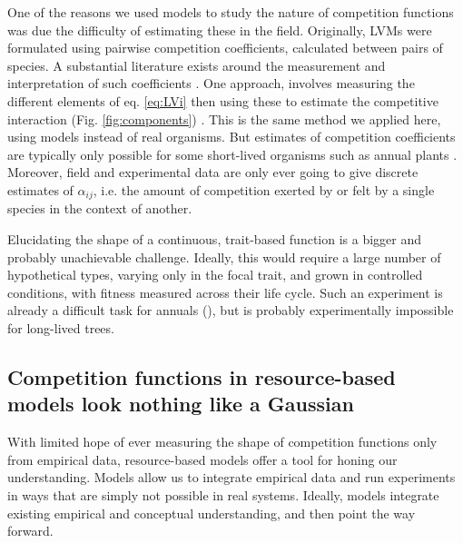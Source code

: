 \documentclass[a4paper,11pt]{article}
\begin{document}
One of the reasons we used models to study the nature of competition functions was due the difficulty of estimating these in the field. Originally, LVMs were formulated using pairwise competition coefficients, calculated between pairs of species. A substantial literature exists around the measurement and interpretation of such coefficients \citep[e.g.]{Ricklefs-1973, Abrams-1980, Law-1997a,Freckleton-2001, Kraft-2015}. One approach, involves measuring the different elements of eq. \ref{eq:LVi} then using these to estimate the competitive interaction (Fig. \ref{fig:components}) \citet{Ricklefs-1973}. This is the same method we applied here, using models instead of real organisms. But estimates of competition coefficients are typically only possible for some short-lived organisms such as annual plants \citep{Kraft-2015, Mayfield-2017, Law-1997,Freckleton-2001}. Moreover, field and experimental data are only ever going to give discrete estimates of $\alpha_{ij}$, i.e. the amount of competition exerted by or felt by a single species in the context of another. 

Elucidating the shape of a continuous, trait-based function is a
bigger and probably unachievable challenge. Ideally, this would
require a large number of hypothetical types, varying only in the
focal trait, and grown in controlled conditions, with fitness measured
across their life cycle. Such an experiment is already a difficult
task for annuals (\citep{Kraft-2015}), but is probably experimentally impossible for long-lived trees.

\subsection{Competition functions in resource-based models look nothing like a  Gaussian}

With limited hope of ever measuring the shape of competition functions
only from empirical data, resource-based models offer a tool for
honing our understanding. Models allow us to integrate empirical data and run experiments in ways that are simply not possible in real systems. Ideally, models integrate existing empirical and conceptual understanding, and then point the way forward.
\end{document}
